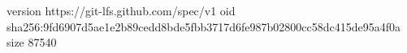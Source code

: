 version https://git-lfs.github.com/spec/v1
oid sha256:9fd6907d5ae1e2b89cedd8bde5fbb3717d6fe987b02800cc58dc415de95a4f0a
size 87540
